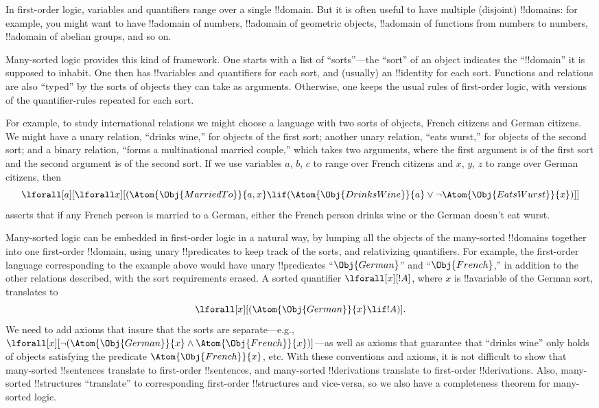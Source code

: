 \documentclass[../../../include/open-logic-section]{subfiles}
\begin{document}

In first-order logic, variables and quantifiers range over a single
!!{domain}. But it is often useful to have multiple (disjoint)
!!{domain}s: for example, you might want to have !!a{domain} of numbers,
!!a{domain} of geometric objects, !!a{domain} of functions from
numbers to numbers, !!a{domain} of abelian groups, and so on.

Many-sorted logic provides this kind of framework. One starts with a
list of ``sorts''---the ``sort'' of an object indicates the
``!!{domain}'' it is supposed to inhabit. One then has !!{variable}s
and quantifiers for each sort, and (usually) an !!{identity} for each
sort. Functions and relations are also ``typed'' by the sorts of
objects they can take as arguments. Otherwise, one keeps the usual
rules of first-order logic, with versions of the quantifier-rules
repeated for each sort.

For example, to study international relations we might choose a
language with two sorts of objects, French citizens and German
citizens. We might have a unary relation, ``drinks wine,'' for objects
of the first sort; another unary relation, ``eats wurst,'' for objects
of the second sort; and a binary relation, ``forms a multinational
married couple,'' which takes two arguments, where the first argument
is of the first sort and the second argument is of the second sort. If
we use variables $a$, $b$, $c$ to range over French citizens and $x$, $y$, $z$
to range over German citizens, then
\[
\lforall[a][\lforall x][(\Atom{\Obj{MarriedTo}}{a,x} \lif
(\Atom{\Obj{DrinksWine}}{a} \lor \lnot \Atom{\Obj{EatsWurst}}{x})]]
\]
asserts that if any French person is married to a German, either the
French person drinks wine or the German doesn't eat wurst.

Many-sorted logic can be embedded in first-order logic in a natural
way, by lumping all the objects of the many-sorted !!{domain}s together
into one first-order !!{domain}, using unary !!{predicate}s to keep track of
the sorts, and relativizing quantifiers. For example, the first-order
language corresponding to the example above would have unary !!{predicate}s
``$\Obj{German}$'' and ``$\Obj{French}$,'' in addition to the other relations
described, with the sort requirements erased. A sorted quantifier $\lforall[x][!A]$, where $x$ is !!a{variable} of the German sort, translates to
\[
\lforall[x][(\Atom{\Obj{German}}{x} \lif !A)].
\]
We need to add axioms that insure that the sorts are separate---e.g.,
$\lforall[x][\lnot (\Atom{\Obj{German}}{x} \land
  \Atom{\Obj{French}}{x})]$---as well as axioms that guarantee that
``drinks wine'' only holds of objects satisfying the predicate
$\Atom{\Obj{French}}{x}$, etc. With these conventions and axioms, it
is not difficult to show that many-sorted !!{sentence}s translate to
first-order !!{sentence}s, and many-sorted !!{derivation}s translate
to first-order !!{derivation}s. Also, many-sorted !!{structure}s
``translate'' to corresponding first-order !!{structure}s and
vice-versa, so we also have a completeness theorem for many-sorted
logic.
\end{document}
